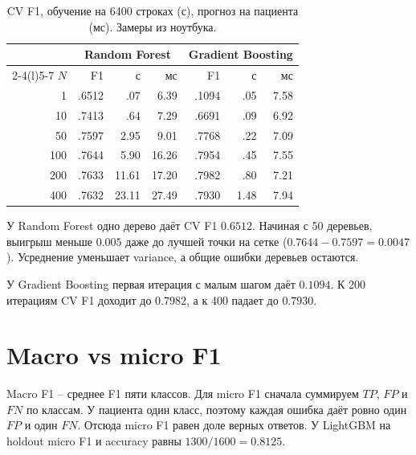 \documentclass[11pt,a4paper,twocolumn]{article}
\begin{document}
\begin{table}[htbp]
    \centering
    \caption{CV F1, обучение на 6400 строках (с), прогноз на пациента (мс). Замеры из ноутбука.}\label{tab:ensemble}
    {\footnotesize\setlength{\tabcolsep}{3pt} \begin{tabular}{@{}r rrr rrr@{}}
    \toprule
    &\multicolumn{3}{c}{Random Forest}&\multicolumn{3}{c}{Gradient Boosting}\\
    \cmidrule(lr){2-4}\cmidrule(l){5-7}
    $N$ & F1 & с & мс & F1 & с & мс\\
    \midrule
    1 & .6512 & .07 & 6.39 & .1094 & .05 & 7.58\\
    10 & .7413 & .64 & 7.29 & .6691 & .09 & 6.92\\
    50 & .7597 & 2.95 & 9.01 & .7768 & .22 & 7.09\\
    100 & .7644 & 5.90 & 16.26 & .7954 & .45 & 7.55\\
    200 & .7633 & 11.61 & 17.20 & .7982 & .80 & 7.21\\
    400 & .7632 & 23.11 & 27.49 & .7930 & 1.48 & 7.94\\
    \bottomrule
    \end{tabular}}
\end{table}

У Random Forest одно дерево даёт CV F1 $0.6512$. Начиная с 50 деревьев, выигрыш меньше $0.005$ даже до лучшей точки на сетке ($0.7644-0.7597=0.0047$). Усреднение уменьшает variance, а общие ошибки деревьев остаются.

У Gradient Boosting первая итерация с малым шагом даёт $0.1094$. К 200 итерациям CV F1 доходит до $0.7982$, а к 400 падает до $0.7930$.

\section{Macro vs micro F1}\label{sec:metrics}

Macro F1 – среднее F1 пяти классов. Для micro F1 сначала суммируем $TP$, $FP$ и $FN$ по классам. У пациента один класс, поэтому каждая ошибка даёт ровно один $FP$ и один $FN$. Отсюда micro F1 равен доле верных ответов. У LightGBM на holdout micro F1 и accuracy равны $1300/1600=0.8125$.
\end{document}
